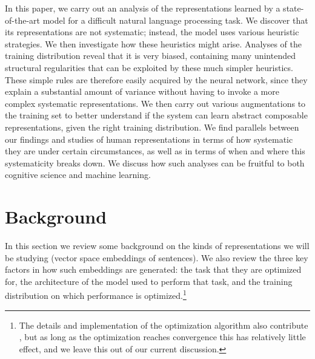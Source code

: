 
In this paper, we carry out an analysis of the representations learned by a state-of-the-art model for a difficult natural language processing task. We discover that its representations are not systematic; instead, the model uses various heuristic strategies. We then investigate how these heuristics might arise. Analyses of the training distribution reveal that it is very biased, containing many unintended structural regularities that can be exploited by these much simpler heuristics. These simple rules are therefore easily acquired by the neural network, since they explain a substantial amount of variance without having to invoke a more complex systematic representations. We then carry out various augmentations to the training set to better understand if the system can learn abstract composable representations, given the right training distribution. We find parallels between our findings and studies of human representations in terms of how systematic they are under certain circumstances, as well as in terms of when and where this systematicity breaks down. We discuss how such analyses can be fruitful to both cognitive science and machine learning.


\section{Background}

In this section we review some background on the kinds of representations we will be studying (vector space embeddings of sentences). We also review the three key factors in how such embeddings are generated: the task that they are optimized for, the architecture of the model used to perform that task, and the training distribution on which performance is optimized.\footnote{The details and implementation of the optimization algorithm also contribute \citep[see][for an overview]{ruder2016overview}, but as long as the optimization reaches convergence this has relatively little effect, and we leave this out of our current discussion.}


